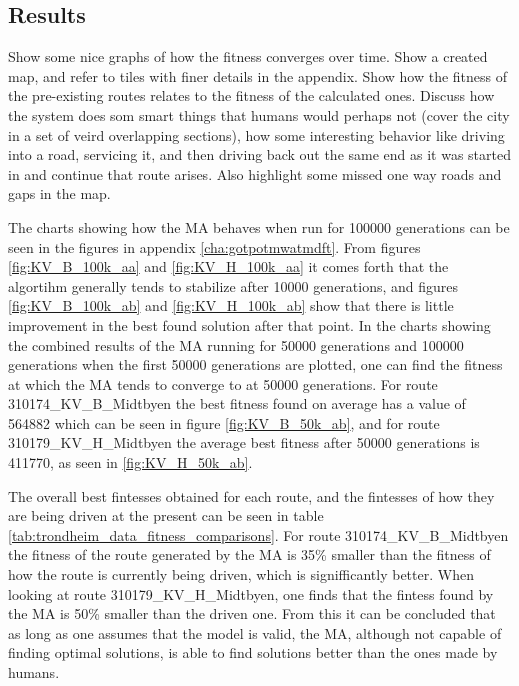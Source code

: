 \subsection{Results}
Show some nice graphs of how the fitness converges over time.
Show a created map, and refer to tiles with finer details in the appendix.
Show how the fitness of the pre-existing routes relates to the fitness of the calculated ones.
Discuss how the system does som smart things that humans would perhaps not (cover the city in a set of veird overlapping sections), how some interesting behavior like driving into a road, servicing it, and then driving back out the same end as it was started in and continue that route arises. Also highlight some missed one way roads and gaps in the map.



The charts showing how the MA behaves when run for 100000 generations can be seen in the figures in appendix \ref{cha:gotpotmwatmdft}. From figures \ref{fig:KV_B_100k_aa} and \ref{fig:KV_H_100k_aa} it comes forth that the algortihm generally tends to stabilize after 10000 generations, and figures \ref{fig:KV_B_100k_ab} and \ref{fig:KV_H_100k_ab} show that there is little improvement in the best found solution after that point. In the charts showing the combined results of the MA running for 50000 generations and 100000 generations when the first 50000 generations are plotted, one can find the fitness at which the MA tends to converge to at 50000 generations. For route 310174\_KV\_B\_Midtbyen the best fitness found on average has a value of 564882 which can be seen in figure \ref{fig:KV_B_50k_ab}, and for route 310179\_KV\_H\_Midtbyen the average best fitness after 50000 generations is 411770, as seen in \ref{fig:KV_H_50k_ab}.

The overall best fintesses obtained for each route, and the fintesses of how they are being driven at the present can be seen in table \ref{tab:trondheim_data_fitness_comparisons}. For route 310174\_KV\_B\_Midtbyen the fitness of the route generated by the MA is 35\% smaller than the fitness of how the route is currently being driven, which is signifficantly better. When looking at route 310179\_KV\_H\_Midtbyen, one finds that the fintess found by the MA is 50\% smaller than the driven one. From this it can be concluded that as long as one assumes that the model is valid, the MA, although not capable of finding optimal solutions, is able to find solutions better than the ones made by humans.


